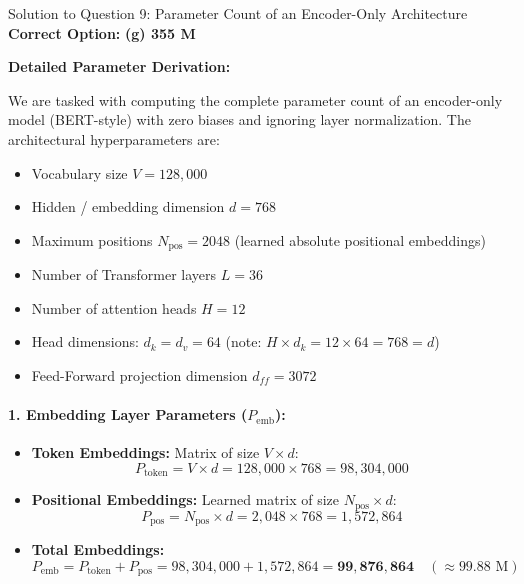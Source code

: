 \documentclass[11pt,a4paper]{article}
\begin{document}
\newpage

\begin{solutionbox}{Solution to Question 9: Parameter Count of an Encoder-Only Architecture}
\textbf{Correct Option:} \textbf{(g) 355 M}

\medskip
\textbf{Detailed Parameter Derivation:}

We are tasked with computing the complete parameter count of an encoder-only model (BERT-style) with zero biases and ignoring layer normalization. The architectural hyperparameters are:
\begin{itemize}[leftmargin=2em]
    \item Vocabulary size $V = 128,000$
    \item Hidden / embedding dimension $d = 768$
    \item Maximum positions $N_{\text{pos}} = 2048$ (learned absolute positional embeddings)
    \item Number of Transformer layers $L = 36$
    \item Number of attention heads $H = 12$
    \item Head dimensions: $d_k = d_v = 64$ (note: $H \times d_k = 12 \times 64 = 768 = d$)
    \item Feed-Forward projection dimension $d_{ff} = 3072$
\end{itemize}

\paragraph{1. Embedding Layer Parameters ($P_{\text{emb}}$):}
\begin{itemize}[leftmargin=1.5em]
    \item \textbf{Token Embeddings:} Matrix of size $V \times d$:
    \begin{equation}
        P_{\text{token}} = V \times d = 128,000 \times 768 = 98,304,000
    \end{equation}
    \item \textbf{Positional Embeddings:} Learned matrix of size $N_{\text{pos}} \times d$:
    \begin{equation}
        P_{\text{pos}} = N_{\text{pos}} \times d = 2,048 \times 768 = 1,572,864
    \end{equation}
    \item \textbf{Total Embeddings:}
    \begin{equation}
        P_{\text{emb}} = P_{\text{token}} + P_{\text{pos}} = 98,304,000 + 1,572,864 = \mathbf{99,876,864} \quad (\approx 99.88\text{ M})
    \end{equation}
\end{itemize}


\end{solutionbox}
\end{document}
